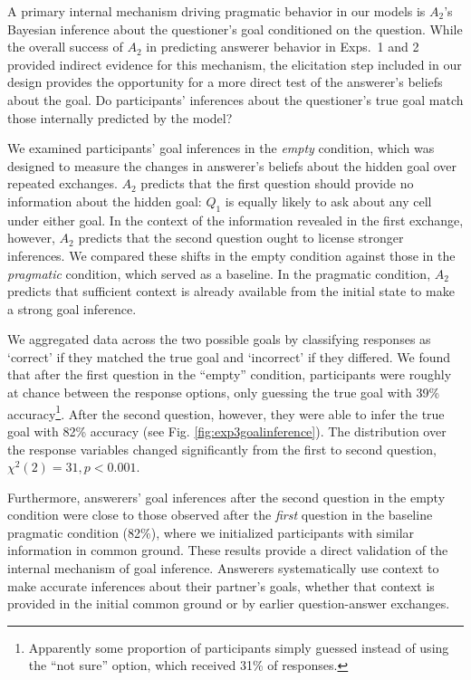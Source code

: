 \documentclass[11pt, floatsintext]{apa6}
\begin{document}
A primary internal mechanism driving pragmatic behavior in our models is $A_2$'s Bayesian inference about the questioner's goal conditioned on the question. 
While the overall success of $A_2$ in predicting answerer behavior in Exps.~1 and 2 provided indirect evidence for this mechanism, the elicitation step included in our design provides the opportunity for a more direct test of the answerer's beliefs about the goal.
Do participants' inferences about the questioner's true goal match those internally predicted by the model?

We examined participants' goal inferences in the \emph{empty} condition, which was designed to measure the changes in answerer's beliefs about the hidden goal over repeated exchanges. 
$A_2$ predicts that the first question should provide no information about the hidden goal: $Q_1$ is equally likely to ask about any cell under either goal.
In the context of the information revealed in the first exchange, however, $A_2$ predicts that the second question ought to license stronger inferences.
We compared these shifts in the empty condition against those in the \emph{pragmatic} condition, which served as a baseline.
In the pragmatic condition, $A_2$ predicts that sufficient context is already available from the initial state to make a strong goal inference.

We aggregated data across the two possible goals by classifying responses as `correct' if they matched the true goal and `incorrect' if they differed.
We found that after the first question in the ``empty'' condition, participants were roughly at chance between the response options, only guessing the true goal with 39\% accuracy\footnote{Apparently some proportion of participants simply guessed instead of using the ``not sure'' option, which received 31\% of responses.}.
After the second question, however, they were able to infer the true goal with 82\% accuracy (see Fig. \ref{fig:exp3goalinference}).
The distribution over the response variables changed significantly from the first to second question, $\chi^2(2) = 31, p < 0.001$.

Furthermore, answerers' goal inferences after the second question in the empty condition were close to those observed after the \emph{first} question in the baseline pragmatic condition (82\%), where we initialized participants with similar information in common ground.
These results provide a direct validation of the internal mechanism of goal inference.
Answerers systematically use context to make accurate inferences about their partner's goals, whether that context is provided in the initial common ground or by earlier question-answer exchanges.
\end{document}
